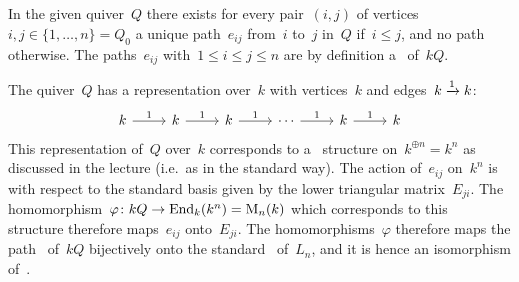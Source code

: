 \section{}

In the given quiver~$Q$ there exists for every pair~$(i,j)$ of vertices~$i,j \in \{1, \dotsc, n\} = Q_0$ a unique path~$e_{ij}$ from~$i$ to~$j$ in~$Q$ if~$i \leq j$, and no path otherwise.
The paths~$e_{ij}$ with~$1 \leq i \leq j \leq n$ are by definition a~{\kbasis} of~$kQ$.

The quiver~$Q$ has a representation over~$k$ with vertices~$k$ and edges~$k \xrightarrow{1} k$:
\[
  \begin{tikzcd}
      k
      \arrow{r}[above]{1}
    & k
      \arrow{r}[above]{1}
    & k
      \arrow{r}[above]{1}
    & \cdots
      \arrow{r}[above]{1}
    & k
      \arrow{r}[above]{1}
    & k
  \end{tikzcd}
\]
This representation of~$Q$ over~$k$ corresponds to a~{} structure on~$k^{\oplus n} = k^n$ as discussed in the lecture (i.e.\ as in the standard way).
The action of~$e_{ij}$ on~$k^n$ is with respect to the standard basis given by the lower triangular matrix~$E_{ji}$.
The~{\kalg} homomorphism~$\varphi \colon kQ \to \operatorname{End}_k(k^n) = \operatorname{M}_{n}(k)$ which corresponds to this~{} structure therefore maps~$e_{ij}$ onto~$E_{ji}$.
The homomorphisms~$\varphi$ therefore maps the path~{\kbasis} of~$kQ$ bijectively onto the standard~{\kbasis} of~$L_n$, and it is hence an isomorphism of~{\kalgs}.

% 
% 
% 
% 
% 



